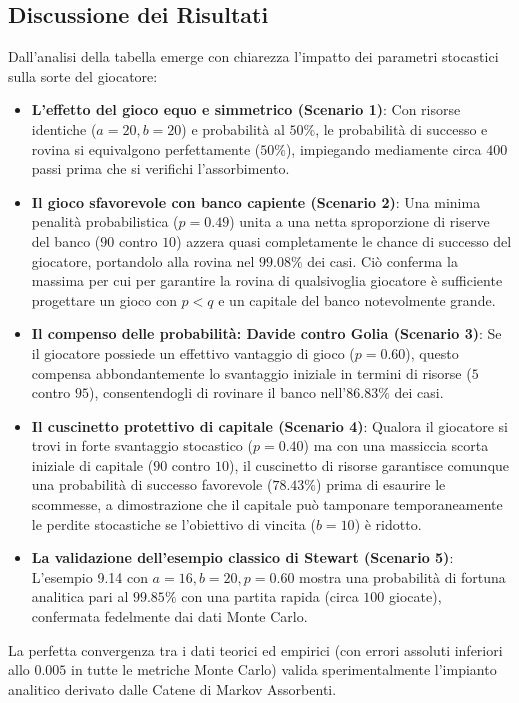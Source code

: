 \documentclass[11pt,a4paper]{article}
\begin{document}
\subsection{Discussione dei Risultati}
Dall'analisi della tabella emerge con chiarezza l'impatto dei parametri stocastici sulla sorte del giocatore:
\begin{itemize}
    \item \textbf{L'effetto del gioco equo e simmetrico (Scenario 1)}: Con risorse identiche ($a=20, b=20$) e probabilità al $50\%$, le probabilità di successo e rovina si equivalgono perfettamente ($50\%$), impiegando mediamente circa $400$ passi prima che si verifichi l'assorbimento.
    \item \textbf{Il gioco sfavorevole con banco capiente (Scenario 2)}: Una minima penalità probabilistica ($p=0.49$) unita a una netta sproporzione di riserve del banco ($90$ contro $10$) azzera quasi completamente le chance di successo del giocatore, portandolo alla rovina nel $99.08\%$ dei casi. Ciò conferma la massima per cui per garantire la rovina di qualsivoglia giocatore è sufficiente progettare un gioco con $p < q$ e un capitale del banco notevolmente grande.
    \item \textbf{Il compenso delle probabilità: Davide contro Golia (Scenario 3)}: Se il giocatore possiede un effettivo vantaggio di gioco ($p=0.60$), questo compensa abbondantemente lo svantaggio iniziale in termini di risorse ($5$ contro $95$), consentendogli di rovinare il banco nell'$86.83\%$ dei casi.
    \item \textbf{Il cuscinetto protettivo di capitale (Scenario 4)}: Qualora il giocatore si trovi in forte svantaggio stocastico ($p=0.40$) ma con una massiccia scorta iniziale di capitale ($90$ contro $10$), il cuscinetto di risorse garantisce comunque una probabilità di successo favorevole ($78.43\%$) prima di esaurire le scommesse, a dimostrazione che il capitale può tamponare temporaneamente le perdite stocastiche se l'obiettivo di vincita ($b=10$) è ridotto.
    \item \textbf{La validazione dell'esempio classico di Stewart (Scenario 5)}: L'esempio 9.14 con $a=16, b=20, p=0.60$ mostra una probabilità di fortuna analitica pari al $99.85\%$ con una partita rapida (circa $100$ giocate), confermata fedelmente dai dati Monte Carlo.
\end{itemize}

La perfetta convergenza tra i dati teorici ed empirici (con errori assoluti inferiori allo $0.005$ in tutte le metriche Monte Carlo) valida sperimentalmente l'impianto analitico derivato dalle Catene di Markov Assorbenti.
\end{document}
